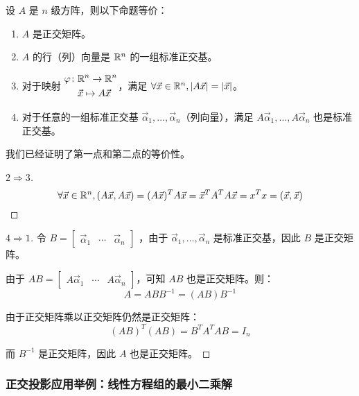 \begin{theorem}
	设 $A$ 是 $n$ 级方阵，则以下命题等价：
	\begin{enumerate}
		\item $A$ 是正交矩阵。
		\item $A$ 的行（列）向量是 $\mathbb R^n$ 的一组标准正交基。
		\item 对于映射 $\begin{aligned} \varphi \colon & \mathbb R^n \to \mathbb R^n \\ & \vec x \mapsto A \vec x \end{aligned}$，满足 $\forall \vec x \in \mathbb R^n, |A \vec x| = |\vec x|$。
		\item 对于任意的一组标准正交基 $\vec \alpha_1, \ldots, \vec \alpha_n$（列向量），满足 $A \vec \alpha_1, \ldots, A \vec \alpha_n$ 也是标准正交基。
	\end{enumerate}
\end{theorem}

我们已经证明了第一点和第二点的等价性。

\begin{proof}[$2 \Longrightarrow 3$]
	$$
	\forall \vec x \in \mathbb R^n, (A \vec x, A \vec x) = (A\vec x)^T A \vec x = \vec x^T A^T A \vec x = x^T x = (\vec x, \vec x)
	$$
\end{proof}

\begin{proof}[$4 \Longrightarrow 1$]
	令 $B = \begin{bmatrix} \vec \alpha_1 & \cdots & \vec \alpha_n \end{bmatrix}$ ，由于 $\vec \alpha_1, \ldots, \vec \alpha_n$ 是标准正交基，因此 $B$ 是正交矩阵。

	由于 $AB = \begin{bmatrix} A \vec \alpha_1 & \cdots & A \vec \alpha_n \end{bmatrix}$，可知 $AB$ 也是正交矩阵。则：
	$$
	A = ABB^{-1} = (AB) B^{-1}
	$$

	由于正交矩阵乘以正交矩阵仍然是正交矩阵：
	$$
	(AB)^T(AB) = B^TA^TAB = I_n
	$$

	而 $B^{-1}$ 是正交矩阵，因此 $A$ 也是正交矩阵。
\end{proof}

\subsubsection{正交投影应用举例：线性方程组的最小二乘解}

